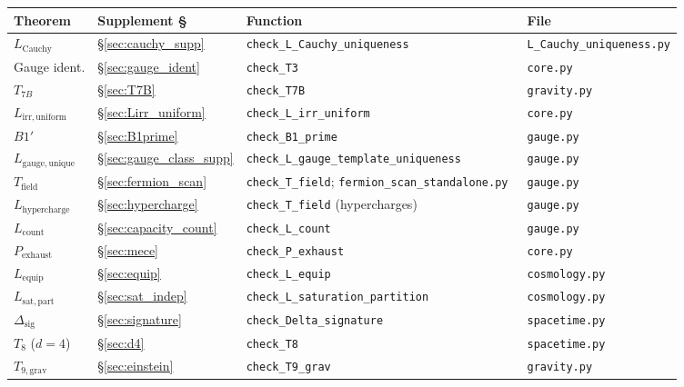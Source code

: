 \documentclass[11pt,a4paper]{article}
\theoremstyle{definition}
\begin{document}
\smallskip
\begin{center}\small
\renewcommand{\arraystretch}{1.15}
\begin{tabular}{@{}llll@{}}
\toprule
\textbf{Theorem} & \textbf{Supplement \S} & \textbf{Function} & \textbf{File} \\
\midrule
$L_{\mathrm{Cauchy}}$ & \S\ref{sec:cauchy_supp} & \texttt{check\_L\_Cauchy\_uniqueness} & \texttt{L\_Cauchy\_uniqueness.py} \\
Gauge ident. & \S\ref{sec:gauge_ident} & \texttt{check\_T3} & \texttt{core.py} \\
$T_{7B}$ & \S\ref{sec:T7B} & \texttt{check\_T7B} & \texttt{gravity.py} \\
$L_{\mathrm{irr,uniform}}$ & \S\ref{sec:Lirr_uniform} & \texttt{check\_L\_irr\_uniform} & \texttt{core.py} \\
$B1'$ & \S\ref{sec:B1prime} & \texttt{check\_B1\_prime} & \texttt{gauge.py} \\
$L_{\mathrm{gauge,unique}}$ & \S\ref{sec:gauge_class_supp} & \texttt{check\_L\_gauge\_template\_uniqueness} & \texttt{gauge.py} \\
$T_{\mathrm{field}}$ & \S\ref{sec:fermion_scan} & \texttt{check\_T\_field}; \texttt{fermion\_scan\_standalone.py}~\cite{BrookeFermionScan} & \texttt{gauge.py} \\
$L_{\mathrm{hypercharge}}$ & \S\ref{sec:hypercharge} & \texttt{check\_T\_field} (hypercharges) & \texttt{gauge.py} \\
$L_{\mathrm{count}}$ & \S\ref{sec:capacity_count} & \texttt{check\_L\_count} & \texttt{gauge.py} \\
$P_{\mathrm{exhaust}}$ & \S\ref{sec:mece} & \texttt{check\_P\_exhaust} & \texttt{core.py} \\
$L_{\mathrm{equip}}$ & \S\ref{sec:equip} & \texttt{check\_L\_equip} & \texttt{cosmology.py} \\
$L_{\mathrm{sat,part}}$ & \S\ref{sec:sat_indep} & \texttt{check\_L\_saturation\_partition} & \texttt{cosmology.py} \\
$\Delta_{\mathrm{sig}}$ & \S\ref{sec:signature} & \texttt{check\_Delta\_signature} & \texttt{spacetime.py} \\
$T_8$ ($d{=}4$) & \S\ref{sec:d4} & \texttt{check\_T8} & \texttt{spacetime.py} \\
$T_{9,\mathrm{grav}}$ & \S\ref{sec:einstein} & \texttt{check\_T9\_grav} & \texttt{gravity.py} \\
\bottomrule
\end{tabular}
\end{center}
\end{document}
